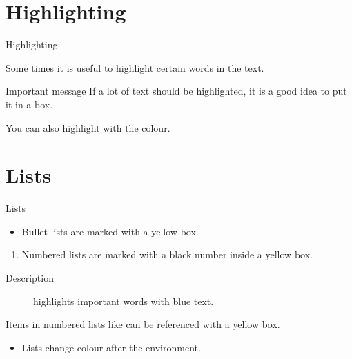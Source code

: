 \documentclass[USenglish, aspectratio = 43]{beamer}
\begin{document}
\section{Highlighting}
\SectionPage

\begin{frame}{Highlighting}

    Some times it is useful to \alert{highlight} certain words in the text.

    \begin{alertblock}{Important message}
        If a lot of text should be \alert{highlighted}, it is a good idea to put it in a box.
    \end{alertblock}

    You can also highlight with the  colour.
\end{frame}

\section{Lists}

\begin{frame}{Lists}

    \begin{itemize}
        \item
        Bullet lists are marked with a yellow box.
    \end{itemize}

    \begin{enumerate}
        \item
        \label{enum:item}
        Numbered lists are marked with a black number inside a yellow box.
    \end{enumerate}

    \begin{description}
        \item[Description] highlights important words with blue text.
    \end{description}

    Items in numbered lists like  can be referenced with a yellow box.

    \begin{example}
        \begin{itemize}
            \item
            Lists change colour after the environment.
        \end{itemize}
    \end{example}
\end{frame}
\end{document}
